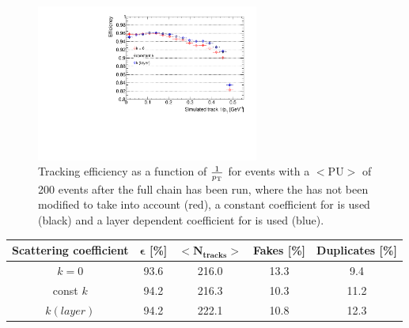 \begin{figure}[htb]
\centering
\includegraphics[width=0.65\textwidth]{figs/tk-upgrade/results-lowPtTracking/kfTrackingEffVsInvPtTiltedGeometry_5000.pdf}
\caption{Tracking efficiency as a function of $\frac{1}{p_{\mathrm{T}}}$ for \ttbar events with a $<\textrm{PU}>$ of 200 events after the full chain has been run, where the \KF has not been modified to take \MS into account (red), a constant coefficient for \MS is used (black) and a layer dependent coefficient for \MS is used (blue).
}
\label{fig:2GeVTiltEff}	
\end{figure}

\begin{table}[htbp]
\label{tab:trackFindingPerformance2GeVKF}
\centering
\begin{tabular}{ccccc}
   \hline
   \bf{Scattering coefficient} & \bf{$\bm{\epsilon}$ [\%]} & $\bm{<N_{tracks}>}$ & \bf{Fakes [\%]} & \bf{Duplicates [\%]}  \\
   \hline
   $k = 0$  & 93.6 & 216.0 & 13.3 & 9.4 \\      
   \hline
   const $k$ & 94.2 & 216.3 & 10.3 & 11.2 \\      
   \hline
    $k(layer)$ & 94.2 & 222.1 & 10.8 & 12.3 \\  
   \hline
   
\end{tabular}%
\end{table}

